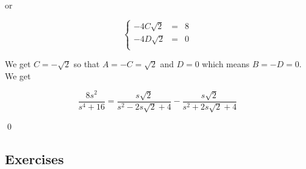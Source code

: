 \documentclass{ximera}
\begin{document}
\begin{example}
\begin{enumerate}
or 

\[ \left\{ \begin{array}{rcr}  -4C\sqrt{2}& = & 8 \\ -4D\sqrt{2} & = & 0 \\ \end{array} \right.\] 

We get $C = -\sqrt{2}$ so that $A = -C = \sqrt{2}$ and $D = 0$ which means $B = -D = 0$.  We get

\[ \dfrac{8s^2}{s^4+16} = \dfrac{s\sqrt{2}}{s^2 - 2s\sqrt{2} + 4} - \dfrac{s\sqrt{2}}{s^2 + 2s\sqrt{2} + 4}\]

\qed

\end{enumerate}

\end{example}

\newpage

\subsection{Exercises}


\closegraphsfile
\end{document}

